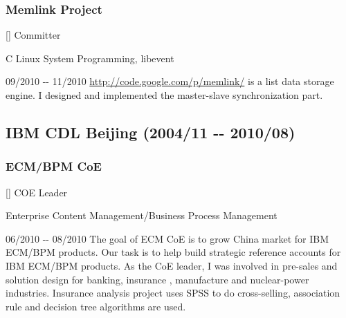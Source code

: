 \documentclass[a4paper]{article}
\newenvironment{DUlineblock}[1]{%
    \list{}{\setlength{\partopsep}{\parskip}
            \addtolength{\partopsep}{\baselineskip}
            \setlength{\topsep}{0pt}
            \setlength{\itemsep}{0.15\baselineskip}
            \setlength{\parsep}{0pt}
            \setlength{\leftmargin}{#1}}
    \raggedright
  }
  {\endlist}
\begin{document}
\begin{CJK}{UTF8}{gkai}
\subsubsection*{Memlink Project}
\begin{DUlineblock}{0em}
\item[] Committer
\item[] C Linux System Programming, libevent
\item[] 09/2010 -{}- 11/2010
\end{DUlineblock}
\url{http://code.google.com/p/memlink/} is a list data storage engine. I designed and
implemented the master-slave synchronization part.

\subsection*{IBM CDL Beijing (2004/11 -{}- 2010/08)}

\subsubsection*{ECM/BPM CoE}
\begin{DUlineblock}{0em}
\item[] COE Leader
\item[] Enterprise Content Management/Business Process Management
\item[] 06/2010 -{}- 08/2010
\end{DUlineblock}
The goal of ECM CoE is to grow China market for IBM ECM/BPM products. Our task
is to help build strategic reference accounts for IBM ECM/BPM products. As the
CoE leader, I was involved in pre-sales and solution design for banking, insurance
, manufacture and nuclear-power industries. Insurance analysis project uses SPSS to
do cross-selling, association rule and decision tree algorithms are used.



\end{CJK}
\end{document}
